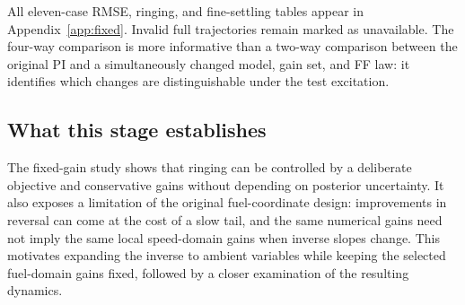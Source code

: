 All eleven-case RMSE, ringing, and fine-settling tables appear in Appendix~\ref{app:fixed}. Invalid full trajectories remain marked as unavailable. The four-way comparison is more informative than a two-way comparison between the original PI and a simultaneously changed model, gain set, and FF law: it identifies which changes are distinguishable under the test excitation.

\subsection{What this stage establishes}
The fixed-gain study shows that ringing can be controlled by a deliberate objective and conservative gains without depending on posterior uncertainty. It also exposes a limitation of the original fuel-coordinate design: improvements in reversal can come at the cost of a slow tail, and the same numerical gains need not imply the same local speed-domain gains when inverse slopes change. This motivates expanding the inverse to ambient variables while keeping the selected fuel-domain gains fixed, followed by a closer examination of the resulting dynamics.




